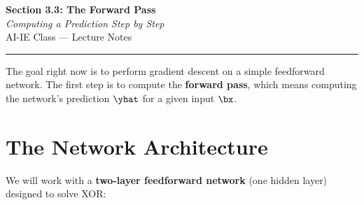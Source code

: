 \documentclass[12pt, a4paper]{article}
\begin{document}
\begin{center}
  {\LARGE \textbf{Section 3.3: The Forward Pass}} \\[0.3em]
  {\large\itshape Computing a Prediction Step by Step} \\[0.5em]
  {\large AI-IE Class --- Lecture Notes}%
  \ifstudentmode
  \fi
\end{center}

\vspace{1em}
\hrule
\vspace{1.5em}

The goal right now is to perform gradient descent on a simple feedforward network. The first step is to compute the \textbf{forward pass}, which means computing the network's prediction $\yhat$ for a given input $\bx$.
\section{The Network Architecture}
We will work with a \textbf{two-layer feedforward network} (one hidden layer)
designed to solve XOR:
\end{document}
